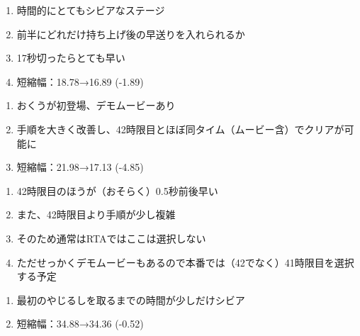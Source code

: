 \begin{enumerate}[label={\sarrow}]
\item 時間的にとてもシビアなステージ
\item 前半にどれだけ持ち上げ後の早送りを入れられるか
\item 17秒切ったらとても早い
\item 短縮幅：18.78→16.89 (-1.89)
\end{enumerate}








\begin{enumerate}[label={\sarrow}]
\item おくうが初登場、デモムービーあり
\item 手順を大きく改善し、42時限目とほぼ同タイム（ムービー含）でクリアが可能に
\item 短縮幅：21.98→17.13 (-4.85)
\end{enumerate}
\begin{marker}
\begin{enumerate}[label={\sarrow}]
\item 42時限目のほうが（おそらく）0.5秒前後早い
\item また、42時限目より手順が少し複雑
\item そのため通常はRTAではここは選択しない
\item ただせっかくデモムービーもあるので本番では（42でなく）41時限目を選択する予定
\end{enumerate}
\end{marker}


\begin{enumerate}[label={\sarrow}]
\item 最初のやじるしを取るまでの時間が少しだけシビア
\item 短縮幅：34.88→34.36 (-0.52)
\end{enumerate}



